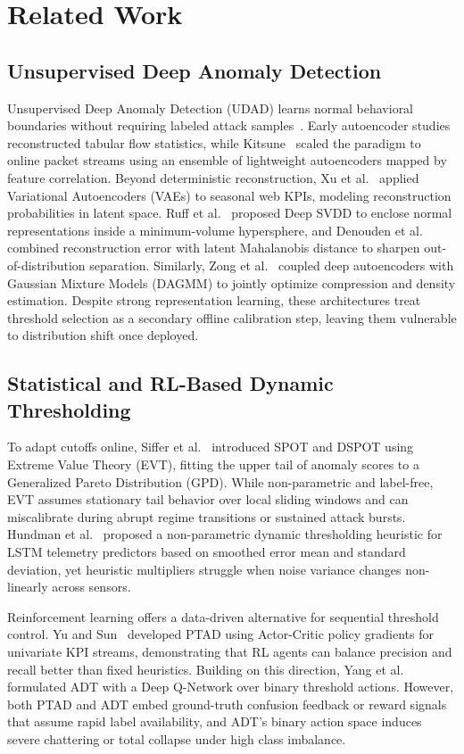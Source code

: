 \documentclass[conference]{IEEEtran}
\begin{document}
\section{Related Work}

\subsection{Unsupervised Deep Anomaly Detection}
Unsupervised Deep Anomaly Detection (UDAD) learns normal behavioral boundaries without requiring labeled attack samples~\cite{chalapathy2019deep}. Early autoencoder studies reconstructed tabular flow statistics, while Kitsune~\cite{mirsky2018kitsune} scaled the paradigm to online packet streams using an ensemble of lightweight autoencoders mapped by feature correlation. Beyond deterministic reconstruction, Xu et al.~\cite{xu2018unsupervised} applied Variational Autoencoders (VAEs) to seasonal web KPIs, modeling reconstruction probabilities in latent space. Ruff et al.~\cite{ruff2018deep} proposed Deep SVDD to enclose normal representations inside a minimum-volume hypersphere, and Denouden et al.~\cite{denouden2018improving} combined reconstruction error with latent Mahalanobis distance to sharpen out-of-distribution separation. Similarly, Zong et al.~\cite{zong2018deep} coupled deep autoencoders with Gaussian Mixture Models (DAGMM) to jointly optimize compression and density estimation. Despite strong representation learning, these architectures treat threshold selection as a secondary offline calibration step, leaving them vulnerable to distribution shift once deployed.

\subsection{Statistical and RL-Based Dynamic Thresholding}
To adapt cutoffs online, Siffer et al.~\cite{siffer2017anomaly} introduced SPOT and DSPOT using Extreme Value Theory (EVT), fitting the upper tail of anomaly scores to a Generalized Pareto Distribution (GPD). While non-parametric and label-free, EVT assumes stationary tail behavior over local sliding windows and can miscalibrate during abrupt regime transitions or sustained attack bursts. Hundman et al.~\cite{hundman2018detecting} proposed a non-parametric dynamic thresholding heuristic for LSTM telemetry predictors based on smoothed error mean and standard deviation, yet heuristic multipliers struggle when noise variance changes non-linearly across sensors.

Reinforcement learning offers a data-driven alternative for sequential threshold control. Yu and Sun~\cite{yu2020policy} developed PTAD using Actor-Critic policy gradients for univariate KPI streams, demonstrating that RL agents can balance precision and recall better than fixed heuristics. Building on this direction, Yang et al.~\cite{yang2023adt} formulated ADT with a Deep Q-Network over binary threshold actions. However, both PTAD and ADT embed ground-truth confusion feedback or reward signals that assume rapid label availability, and ADT's binary action space induces severe chattering or total collapse under high class imbalance.
\end{document}
